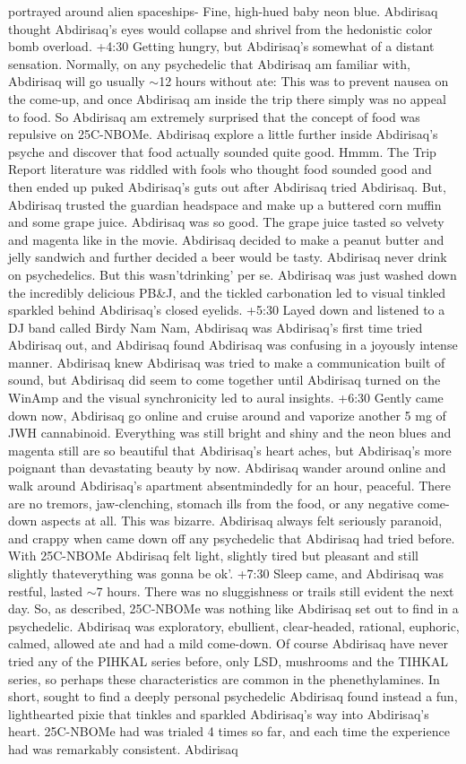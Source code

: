 \documentclass[12pt]{book}
\begin{document}
portrayed around alien spaceships- Fine, high-hued baby neon blue. Abdirisaq thought Abdirisaq's eyes would collapse and shrivel from the hedonistic color bomb overload. +4:30 Getting hungry, but Abdirisaq's somewhat of a distant sensation. Normally, on any psychedelic that Abdirisaq am familiar with, Abdirisaq will go usually $\sim$12 hours without ate: This was to prevent nausea on the come-up, and once Abdirisaq am inside the trip there simply was no appeal to food. So Abdirisaq am extremely surprised that the concept of food was repulsive on 25C-NBOMe. Abdirisaq explore a little further inside Abdirisaq's psyche and discover that food actually sounded quite good. Hmmm. The Trip Report literature was riddled with fools who thought food sounded good and then ended up puked Abdirisaq's guts out after Abdirisaq tried Abdirisaq. But, Abdirisaq trusted the guardian headspace and make up a buttered corn muffin and some grape juice. Abdirisaq was so good. The grape juice tasted so velvety and magenta like in the movie. Abdirisaq decided to make a peanut butter and jelly sandwich and further decided a beer would be tasty. Abdirisaq never drink on psychedelics. But this wasn'tdrinking' per se. Abdirisaq was just washed down the incredibly delicious PB\&J, and the tickled carbonation led to visual tinkled sparkled behind Abdirisaq's closed eyelids. +5:30 Layed down and listened to a DJ band called Birdy Nam Nam, Abdirisaq was Abdirisaq's first time tried Abdirisaq out, and Abdirisaq found Abdirisaq was confusing in a joyously intense manner. Abdirisaq knew Abdirisaq was tried to make a communication built of sound, but Abdirisaq did seem to come together until Abdirisaq turned on the WinAmp and the visual synchronicity led to aural insights. +6:30 Gently came down now, Abdirisaq go online and cruise around and vaporize another 5 mg of JWH cannabinoid. Everything was still bright and shiny and the neon blues and magenta still are so beautiful that Abdirisaq's heart aches, but Abdirisaq's more poignant than devastating beauty by now. Abdirisaq wander around online and walk around Abdirisaq's apartment absentmindedly for an hour, peaceful. There are no tremors, jaw-clenching, stomach ills from the food, or any negative come-down aspects at all. This was bizarre. Abdirisaq always felt seriously paranoid, and crappy when came down off any psychedelic that Abdirisaq had tried before. With 25C-NBOMe Abdirisaq felt light, slightly tired but pleasant and still slightly thateverything was gonna be ok'. +7:30 Sleep came, and Abdirisaq was restful, lasted $\sim$7 hours. There was no sluggishness or trails still evident the next day. So, as described, 25C-NBOMe was nothing like Abdirisaq set out to find in a psychedelic. Abdirisaq was exploratory, ebullient, clear-headed, rational, euphoric, calmed, allowed ate and had a mild come-down. Of course Abdirisaq have never tried any of the PIHKAL series before, only LSD, mushrooms and the TIHKAL series, so perhaps these characteristics are common in the phenethylamines. In short, sought to find a deeply personal psychedelic Abdirisaq found instead a fun, lighthearted pixie that tinkles and sparkled Abdirisaq's way into Abdirisaq's heart. 25C-NBOMe had was trialed 4 times so far, and each time the experience had was remarkably consistent. Abdirisaq 
\end{document}
